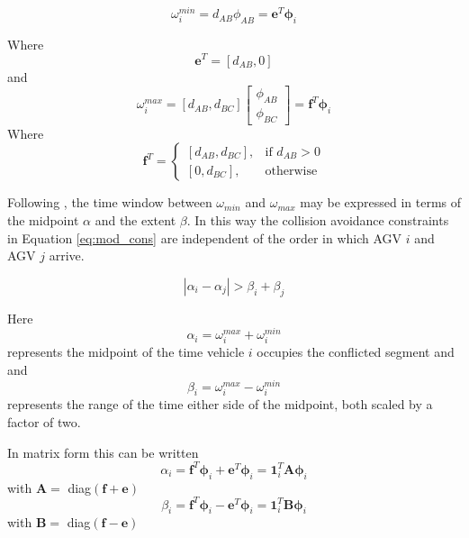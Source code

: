 \begin{equation}
\label{eq:arrive}
\omega_i^{min} = d_{AB} \phi_{AB} = \bm{e}^T \bm{\phi}_i
\end{equation}

Where
\begin{equation}
\label{eq:e_vec}
\bm{e}^T = [d_{AB}, 0]
\end{equation}
and 
\begin{equation}
\label{eq:depart}
\omega_i^{max} = [d_{AB}, d_{BC}]\left[\begin{array}{c}
\phi_{AB}\\
\phi_{BC}
\end{array}\right] = \bm{f}^T \bm{\phi}_i
\end{equation}
Where
\begin{equation}
\label{eq:f_vec}
\bm{f}^T = \begin{cases}
    [d_{AB}, d_{BC}],& \text{if } d_{AB}> 0\\
    [0, d_{BC}],              & \text{otherwise}
\end{cases}
\end{equation}

Following \cite{Digani2019}, the time window between $\omega_{min}$ and $\omega_{max}$ may be expressed in terms of the midpoint $\alpha$ and the extent $\beta$. In this way the collision avoidance constraints in Equation \ref{eq:mod_cons} are independent of the order in which AGV $i$ and AGV $j$ arrive.

\begin{equation}
\label{eq:mod_cons}
|\alpha_i - \alpha_j|> \beta_i + \beta_j
\end{equation}

Here
\begin{equation}
\alpha_i = \omega_i^{max} + \omega_i^{min}
\end{equation}
represents the midpoint of the time vehicle $i$ occupies the conflicted segment and and
\begin{equation}
\beta_i = \omega_i^{max} - \omega_i^{min}
\end{equation}
represents the range of the time either side of the midpoint, both scaled by a factor of two.

In matrix form this can be written
\begin{equation}
\label{eq:alpha_mat}
\alpha_i = \bm{f}^T\bm{\phi}_i + \bm{e}^T\bm{\phi}_i = \bm{1}_i^T\bm{A}\bm{\phi}_i
\end{equation}
with $\bm{A}= $ diag$(\bm{f} + \bm{e})$
\begin{equation}
\label{eq:beta_mat}
\beta_i = \bm{f}^T\bm{\phi}_i - \bm{e}^T\bm{\phi}_i = \bm{1}_i^T\bm{B}\bm{\phi}_i
\end{equation}
with $\bm{B}= $ diag$(\bm{f} - \bm{e})$

